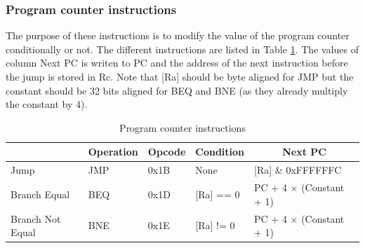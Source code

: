 \subsubsection*{Program counter instructions}

The purpose of these instructions is to modify the value of the program counter conditionally or 
not. The different instructions are listed in Table \ref{tab:instruction/pc}. The values of 
column Next PC is writen to PC and the address of the next instruction before the jump is
stored in Rc. Note that [Ra] should be byte aligned for JMP but the constant should be 32 bits 
aligned for BEQ and BNE (as they already multiply the constant by 4).

\begin{table}[H]
    \centering
    \begin{tabular}{|l|l|l|l|l|}
    \hline
    \rowcolor[HTML]{DAE8FC} 
    \multicolumn{1}{|c|}{\cellcolor[HTML]{DAE8FC}\textbf{Name}} & \multicolumn{1}{c|}{\cellcolor[HTML]{DAE8FC}\textbf{Operation}} & \multicolumn{1}{c|}{\cellcolor[HTML]{DAE8FC}\textbf{Opcode}} & \multicolumn{1}{c|}{\cellcolor[HTML]{DAE8FC}\textbf{Condition}} & \multicolumn{1}{c|}{\cellcolor[HTML]{DAE8FC}\textbf{Next PC}} \\ \hline
    Jump                                                        & JMP                                                             & 0x1B                                                         & None                                                                 & {[}Ra{]} \& 0xFFFFFFC                                         \\ \hline
    Branch Equal                                                & BEQ                                                             & 0x1D                                                         & {[}Ra{]} == 0                                                        & PC + 4 $\times$ (Constant + 1)             \\ \hline
    Branch Not Equal                                            & BNE                                                             & 0x1E                                                         & {[}Ra{]} != 0                                                        & PC + 4 $\times$ (Constant + 1)                \\ \hline
    \end{tabular}
    \caption{Program counter instructions}
    \label{tab:instruction/pc}
\end{table}

